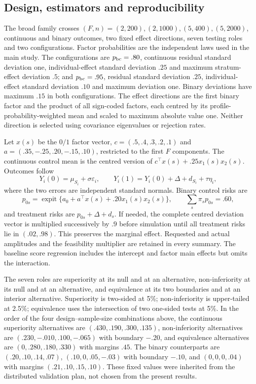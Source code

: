 \documentclass[12pt,a4paper]{article}
\theoremstyle{definition}
\theoremstyle{remark}\newtheorem{remark}{Remark}
\numberwithin{equation}{section}
\begin{document}
\subsection{Design, estimators and reproducibility}
The broad family crosses $(F,n)=(2,200),(2,1000),(5,400),(5,2000)$, continuous and binary outcomes, two fixed effect directions, seven testing roles and two configurations. Factor probabilities are the independent laws used in the main study. The configurations are $p_{\rm bc}=.80$, continuous residual standard deviation one, individual-effect standard deviation $.25$ and maximum stratum-effect deviation $.5$; and $p_{\rm bc}=.95$, residual standard deviation $.25$, individual-effect standard deviation $.10$ and maximum deviation one. Binary deviations have maximum $.15$ in both configurations. The effect directions are the first binary factor and the product of all sign-coded factors, each centred by its profile-probability-weighted mean and scaled to maximum absolute value one. Neither direction is selected using covariance eigenvalues or rejection rates.

Let $x(s)$ be the $0/1$ factor vector, $c=(.5,.4,.3,.2,.1)$ and $a=(.35,-.25,.20,-.15,.10)$, restricted to the first $F$ components. The continuous control mean is the centred version of $c^\top x(s)+.25x_1(s)x_2(s)$. Outcomes follow
\[
 Y_i(0)=\mu_{S_i}+\sigma\varepsilon_i,\qquad
 Y_i(1)=Y_i(0)+\Delta+d_{S_i}+\tau\eta_i,
\]
where the two errors are independent standard normals. Binary control risks are
\[
 p_{0s}=\operatorname{expit}\{a_0+a^\top x(s)+.20x_1(s)x_2(s)\},
 \qquad \sum_s\pi_s p_{0s}=.60,
\]
and treatment risks are $p_{0s}+\Delta+d_s$. If needed, the complete centred deviation vector is multiplied successively by $.9$ before simulation until all treatment risks lie in $(.02,.98)$. This preserves the marginal effect. Requested and actual amplitudes and the feasibility multiplier are retained in every summary. The baseline score regression includes the intercept and factor main effects but omits the interaction.

The seven roles are superiority at its null and at an alternative, non-inferiority at its null and at an alternative, and equivalence at its two boundaries and at an interior alternative. Superiority is two-sided at 5\%; non-inferiority is upper-tailed at 2.5\%; equivalence uses the intersection of two one-sided tests at 5\%. In the order of the four design--sample-size combinations above, the continuous superiority alternatives are $(.430,.190,.300,.135)$, non-inferiority alternatives are $(.230,-.010,.100,-.065)$ with boundary $-.20$, and equivalence alternatives are $(0,.280,.180,.330)$ with margins $.45$. The binary counterparts are $(.20,.10,.14,.07)$, $(.10,0,.05,-.03)$ with boundary $-.10$, and $(0,0,0,.04)$ with margins $(.21,.10,.15,.10)$. These fixed values were inherited from the distributed validation plan, not chosen from the present results.
\end{document}
